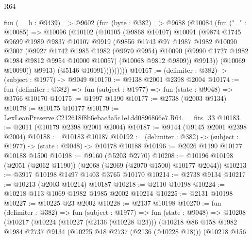 \begin{lexlean}{R64}
\begin{coremodule}
            fun (__h : @9439) =>
            @9602
              (fun (byte : @382) =>
              @9688
                (@10084
                  (fun ("_" : @10085) =>
                  @10096
                    (@10102
                      (@10105
                        (@9868 @10107)
                        @10091
                        (@9874
                          @1745
                          @9699
                          @1989
                          @9837
                          @10107
                          @9919
                          (@9856
                            @1743
                            @97
                            @1987
                            @1982
                            @10090
                            @2007
                            (@9927
                              @1742
                              @1985
                              @1982
                              (@9970 @9954)
                              @10090
                              (@9990 @1727 @1982 @1984 @9812 @9954 @10000 @10057)
                              (@10068 @9812 @9809))
                            @9913))
                        (@10069 @10090))
                      @9913)
                    (@5146 @10091)))))))))
@10167 := (delimiter : @382) -> (subject : @1977) -> @9049
@10170 := @9138 @2001 @2398 @2004
@10174 := fun (delimiter : @382) => fun (subject : @1977) => fun (state : @9048) => @3766 @10170
@10175 := @1997 @1190
@10177 := @2738 (@2003 @9134)
@10178 := @10175 @10177
@10179 := LexLeanPreserve.C212618f8b6ebac3a5c1e1dd0896866e7.R64.__fits_33
@10183 := @2011 (@10179 @2398 @2001 @2004)
@10187 := @9144 (@9145 @2001 @2398 @2004)
@10188 := @10183 @10187
@10192 := (delimiter : @382) -> (subject : @1977) -> (state : @9048) -> @10178 @10188
@10196 := @2026 @1190 @10177 @10188 @1500
@10198 := @9160 (@5203 @2770)
@10208 := @10196 @10198 (@2051 (@2062 @1190)) (@2068 (@2069 (@2070 @1500) @10177 @2044))
@10213 := @3917 @10198 @1497 @1403 @3765 @10170
@10214 := @2738 @9134
@10217 := @10213 (@2003 @10214) @10187
@10218 := @2110 @10198
@10224 := @10218 @113 @1069 @1982 @1985 @2002 @10214
@10225 := @2131 @10198
@10227 := @10225 @23 @2002
@10228 := @2137 @10198
@10270 := fun (delimiter : @382) =>
  fun (subject : @1977) =>
  fun (state : @9048) =>
  @10208
    (@10217
      (@10224
        (@10227 (@2136 (@10228 @23)))
        (@10218
          @86
          @158
          @1982
          @1984
          @2737
          @9134
          (@10225 @18 @2737 (@2136 (@10228 @18)))
          (@10218
            @156

\end{coremodule}
\end{lexlean}
